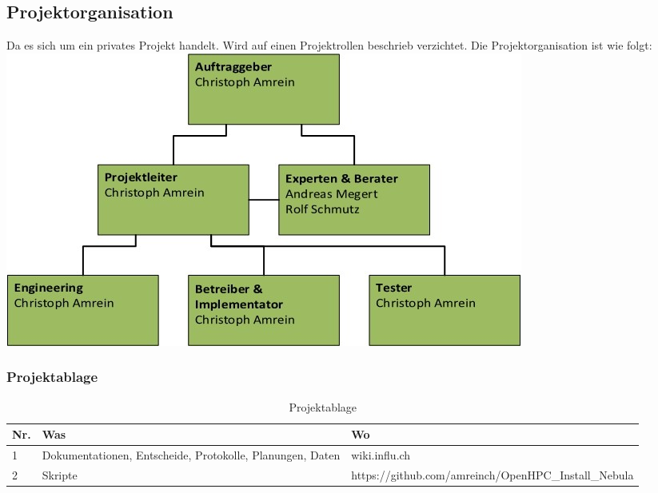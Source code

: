 \subsection{Projektorganisation}
Da es sich um ein privates Projekt handelt. Wird auf einen Projektrollen beschrieb verzichtet. Die Projektorganisation ist wie folgt:
\center
\includegraphics[scale=0.9]{Bilder/Projektorganisation.jpg}

\subsubsection{Projektablage}

\begin{table}[H]
\centering
\begin{tabular}[t]{p{1cm}p{4cm}p{10cm}}
\hline
\rowcolor{heading}\textbf{Nr.} & \textbf{Was} & \textbf{Wo} \\\hline
1 & Dokumentationen, Entscheide, Protokolle, Planungen, Daten & wiki.influ.ch \\\hline
2 & Skripte & https://github.com/amreinch/OpenHPC\_Install\_Nebula \\\hline
\end{tabular}
\caption{Projektablage}
\end{table}
